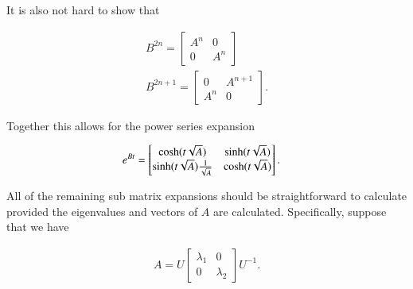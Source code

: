 It is also not hard to show that 

\begin{subequations}
\label{eqn:hoopSpring:10}
\begin{align}
B^{2n} = 
\begin{bmatrix}
A^n & 0 \\
0 & A^n
\end{bmatrix} \\
B^{2n+1} = 
\begin{bmatrix}
0 & A^{n+1} \\
A^n & 0
\end{bmatrix}.
\end{align}
\end{subequations}

Together this allows for the power series expansion 

\begin{align}\label{eqn:hoopSpring:11}
e^{Bt} &=
\begin{bmatrix}
\cosh(t \sqrt{A}) & \sinh(t \sqrt{A}) \\
\sinh(t \sqrt{A}) \frac{1}{\sqrt{A}} & \cosh(t \sqrt{A})
\end{bmatrix}.
\end{align}

All of the remaining sub matrix expansions should be straightforward to calculate provided the eigenvalues and vectors of $A$ are calculated.  Specifically, suppose that we have

\begin{align}\label{eqn:hoopSpring:12}
A = U 
\begin{bmatrix}
\lambda_1 & 0 \\
0 & \lambda_2 
\end{bmatrix}
U^{-1}.
\end{align}

